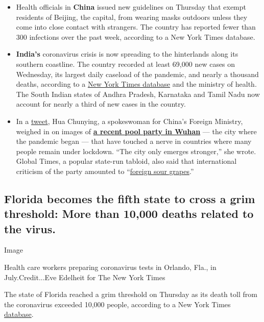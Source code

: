 \begin{itemize}
\item
  Health officials in \textbf{China} issued new guidelines on Thursday
  that exempt residents of Beijing, the capital, from wearing masks
  outdoors unless they come into close contact with strangers. The
  country has reported fewer than 300 infections over the past week,
  according to a New York Times database.
\item
  \textbf{India's} coronavirus crisis is now spreading to the
  hinterlands along its southern coastline. The country recorded at
  least 69,000 new cases on Wednesday, its largest daily caseload of the
  pandemic, and nearly a thousand deaths, according to a
  \href{https://www.nytimes3xbfgragh.onion/interactive/2020/world/asia/india-coronavirus-cases.html}{New
  York Times database} and the ministry of health. The South Indian
  states of Andhra Pradesh, Karnataka and Tamil Nadu now account for
  nearly a third of new cases in the country.
\item
  In a
  \href{https://twitter.com/SpokespersonCHN/status/1296006313789362176}{tweet},
  Hua Chunying, a spokeswoman for China's Foreign Ministry, weighed in
  on images of
  \textbf{\href{https://www.nytimes3xbfgragh.onion/2020/08/18/world/coronavirus-covid.html\#link-6e70b04a}{a
  recent pool party in Wuhan}} --- the city where the pandemic began ---
  that have touched a nerve in countries where many people remain under
  lockdown. ``The city only emerges stronger,'' she wrote. Global Times,
  a popular state-run tabloid, also said that international criticism of
  the party amounted to
  ``\href{https://www.globaltimes.cn/content/1198239.shtml}{foreign sour
  grapes}.''
\end{itemize}

\hypertarget{florida-becomes-the-fifth-state-to-cross-a-grim-threshold-more-than-10000-deaths-related-to-the-virus}{%
\subsection{Florida becomes the fifth state to cross a grim threshold:
More than 10,000 deaths related to the
virus.}\label{florida-becomes-the-fifth-state-to-cross-a-grim-threshold-more-than-10000-deaths-related-to-the-virus}}

Image

Health care workers preparing coronavirus tests in Orlando, Fla., in
July.Credit...Eve Edelheit for The New York Times

The state of Florida reached a grim threshold on Thursday as its death
toll from the coronavirus exceeded 10,000 people, according to a New
York Times
\href{https://www.nytimes3xbfgragh.onion/interactive/2020/us/florida-coronavirus-cases.html}{database}.

